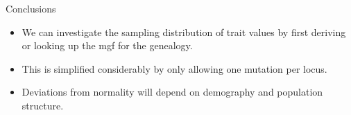 \documentclass{beamer}
\newcommand{\E}{\mathrm{E}}
\begin{document}


\begin{frame}{Conclusions}
  \begin{itemize}
  \item We can investigate the sampling distribution of trait values by first
    deriving or looking up the mgf for the genealogy.
  \item This is simplified considerably by only allowing one mutation per locus.
  \item Deviations from normality will depend on demography and population
    structure.
  \end{itemize}
\end{frame}
\end{document}

